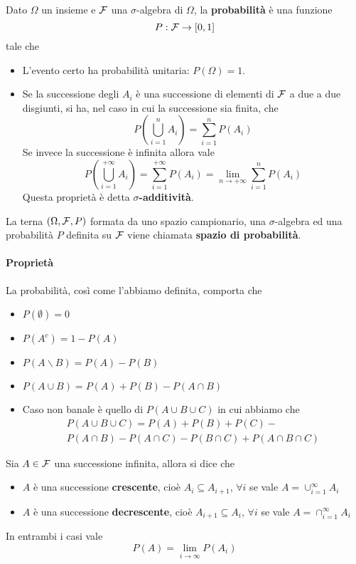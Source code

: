 \begin{definition}
	Dato $\Omega$ un insieme e $\mathcal{F}$ una $\sigma$-algebra di $\Omega$, la \textbf{probabilità} è
	una funzione
	\[ P : \mathcal{F} \to [0, 1] \]
	tale che
	\begin{itemize}
		\item L'evento certo ha probabilità unitaria: $P(\Omega) = 1$.
		\item Se la successione degli $A_i$ è una successione di elementi di $\mathcal{F}$ a due a due
		      disgiunti, si ha, nel caso in cui la successione sia finita, che
		      \[ P \left( \bigcup_{i=1}^n A_i \right) = \sum_{i=1}^n P(A_i) \]
		      Se invece la successione è infinita allora vale
		      \[
			      P \left( \bigcup_{i=1}^{+\infty} A_i \right) = \sum_{i=1}^{+\infty} P(A_i) =
			      \lim_{n \to +\infty} \sum_{i=1}^n P(A_i)
		      \]
		      Questa proprietà è detta $\sigma$\textbf{-additività}.
	\end{itemize}
\end{definition}

\begin{definition}
	La terna $(\Omega, \mathcal{F}, P)$ formata da uno spazio campionario, una $\sigma$-algebra ed una
	probabilità $P$ definita su $\mathcal{F}$ viene chiamata \textbf{spazio di probabilità}.
\end{definition}

\paragraph{Proprietà} La probabilità, così come l'abbiamo definita, comporta che
\begin{itemize}
	\item $P(\emptyset) = 0$
	\item $P(A^c) = 1 - P(A)$
	\item $P(A \backslash B) = P(A) - P(B)$
	\item $P(A \cup B) = P(A) + P(B) - P(A \cap B)$
	\item Caso non banale è quello di $P(A \cup B \cup C)$ in cui abbiamo che
	      \begin{multline*}
		      P(A \cup B \cup C) = P(A) + P(B) + P(C) - \\
		      P(A \cap B) - P(A \cap C) - P(B \cap C) + P(A \cap B \cap C)
	      \end{multline*}
\end{itemize}

\begin{proposition}
	Sia $A \in \mathcal{F}$ una successione infinita, allora si dice che
	\begin{itemize}
		\item $A$ è una successione \textbf{crescente}, cioè $A_i \subseteq A_{i+1}$, $\forall i$
		      se vale $A = \cup_{i=1}^\infty A_i$
		\item $A$ è una successione \textbf{decrescente}, cioè $A_{i+1} \subseteq A_i$,
		      $\forall i$ se vale $A = \cap_{i=1}^\infty A_i$
	\end{itemize}
	In entrambi i casi vale
	\[ P(A) = \lim_{i \to \infty} P(A_i) \]
\end{proposition}

